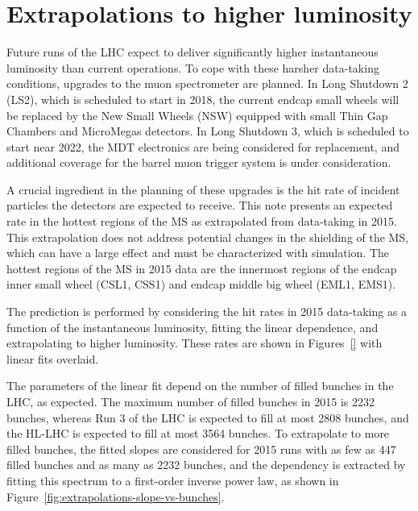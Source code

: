 \section{Extrapolations to higher luminosity}
\label{sec:extrapolations}

Future runs of the LHC expect to deliver significantly higher instantaneous luminosity than current operations. To cope with these harsher data-taking conditions, upgrades to the muon spectrometer are planned. In Long Shutdown 2 (LS2), which is scheduled to start in 2018, the current endcap small wheels will be replaced by the New Small Wheels (NSW) equipped with small Thin Gap Chambers and MicroMegas detectors. In Long Shutdown 3, which is scheduled to start near 2022, the MDT electronics are being considered for replacement, and additional coverage for the barrel muon trigger system is under consideration.

A crucial ingredient in the planning of these upgrades is the hit rate of incident particles the detectors are expected to receive. This note presents an expected rate in the hottest regions of the MS as extrapolated from data-taking in 2015. This extrapolation does not address potential changes in the shielding of the MS, which can have a large effect and must be characterized with simulation. The hottest regions of the MS in 2015 data are the innermost regions of the endcap inner small wheel (CSL1, CSS1) and endcap middle big wheel (EML1, EMS1).

The prediction is performed by considering the hit rates in 2015 data-taking as a function of the instantaneous luminosity, fitting the linear dependence, and extrapolating to higher luminosity. These rates are shown in Figures~\ref{} with linear fits overlaid.

The parameters of the linear fit depend on the number of filled bunches in the LHC, as expected. The maximum number of filled bunches in 2015 is 2232 bunches, whereas Run 3 of the LHC is expected to fill at most 2808 bunches, and the HL-LHC is expected to fill at most 3564 bunches. To extrapolate to more filled bunches, the fitted slopes are considered for 2015 runs with as few as 447 filled bunches and as many as 2232 bunches, and the dependency is extracted by fitting this spectrum to a first-order inverse power law, as shown in Figure~\ref{fig:extrapolations-slope-vs-bunches}. 


